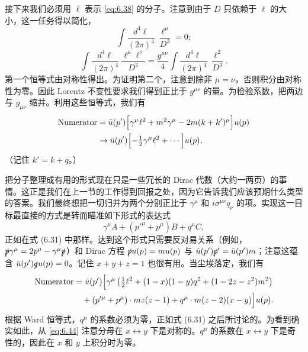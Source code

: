 接下来我们必须用 $\ell$ 表示 \eqref{eq:6.38} 的分子。注意到由于 $D$ 只依赖于 $\ell$ 的大小，这一任务得以简化，
\begin{equation}
  \int \frac{d^4\ell}{(2\pi)^4}\ \frac{\ell^\mu}{D^3} = 0;
  \label{eq:6.45}
\end{equation}
\begin{equation}
  \int \frac{d^4\ell}{(2\pi)^4}\ \frac{\ell^\mu\ell^\nu}{D^3}
    = \frac{g^{\mu\nu}}{4}\int \frac{d^4\ell}{(2\pi)^4}\ \frac{\ell^2}{D^3} .
  \label{eq:6.46}
\end{equation}
第一个恒等式由对称性得出。为证明第二个，注意到除非 $\mu = \nu$，否则积分由对称性为零。因此 Lorentz 不变性要求我们得到正比于 $g^{\mu\nu}$ 的量。为检验系数，把两边与 $g_{\mu\nu}$ 缩并。利用这些恒等式，我们有
\begin{equation}
  \begin{aligned}
    \text{Numerator} &= \bar{u}(p')\Bigl[ \gamma^\mu\ell^2 + m^2\gamma^\mu
      - 2m(k+k')^\mu \Bigr]u(p)\\
    &\to \bar{u}(p')\Bigl[ -\tfrac{1}{2}\gamma^\mu\ell^2
      + \cdots \Bigr]u(p),
  \end{aligned}
\end{equation}
（记住 $k' = k+q$。）

把分子整理成有用的形式现在只是一些冗长的 Dirac 代数（大约一两页）的事情。这正是我们在上一节的工作得到回报之处，因为它告诉我们应该预期什么类型的答案。我们最终想把一切归并为两个分别正比于 $\gamma^\mu$ 和 $i\sigma^{\mu\nu}q_\nu$ 的项。实现这一目标最直接的方式是转而瞄准如下形式的表达式
\begin{equation}
  \gamma^\mu A + (p'^{\mu}+p^\mu)B + q^\mu C,
\end{equation}
正如在式 (6.31) 中那样。达到这个形式只需要反对易关系（例如，$\slashed{p}\gamma^\mu = 2p^\mu - \gamma^\mu\slashed{p}$）和 Dirac 方程 $\slashed{p}u(p) = mu(p)$ 与 $\bar{u}(p')\slashed{p}' = \bar{u}(p')m$；注意这蕴含 $\bar{u}(p')\slashed{q}u(p) = 0$。记住 $x+y+z = 1$ 也很有用。当尘埃落定，我们有
\begin{equation}
  \begin{aligned}
    \text{Numerator} &= \bar{u}(p')\Bigl[ \gamma^\mu\,
      \bigl( \tfrac{1}{2}\ell^2 + (1-x)(1-y)q^2 + (1-2z-z^2)m^2 \bigr)\\
    &\quad + (p'^{\mu}+p^\mu)\cdot mz(z-1)
      + q^\mu\cdot m(z-2)(x-y) \Bigr]u(p) .
  \end{aligned}
\end{equation}
根据 Ward 恒等式，$q^\mu$ 的系数必须为零，正如式 (6.31) 之后所讨论的。为看到确实如此，从 \eqref{eq:6.44} 注意分母在 $x\leftrightarrow y$ 下是对称的。$q^\mu$ 的系数在 $x\leftrightarrow y$ 下是奇性的，因此在 $x$ 和 $y$ 上积分时为零。

